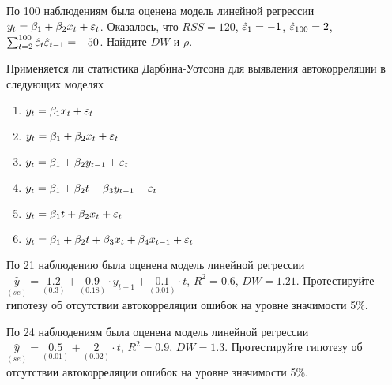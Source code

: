 \begin{problem}
По 100 наблюдениям была оценена модель линейной регрессии
$y_t=\beta_1+\beta_2 x_t+\varepsilon_t$. Оказалось, что $RSS=120$, $\hat{\varepsilon}_1=-1$, $\hat{\varepsilon}_{100}=2$, $\sum_{t=2}^{100} \hat{\varepsilon}_t\hat{\varepsilon}_{t-1}=-50$. Найдите $DW$ и $\rho$.


\begin{sol}
\end{sol}
\end{problem}



\begin{problem}
Применяется ли статистика Дарбина-Уотсона для выявления автокорреляции в следующих моделях
\begin{enumerate}
\item $y_t=\beta_1 x_t + \varepsilon_t$
\item $y_t=\beta_1 + \beta_2 x_t + \varepsilon_t$
\item $y_t=\beta_1 + \beta_2 y_{t-1} + \varepsilon_t$
\item $y_t=\beta_1 + \beta_2 t +\beta_3 y_{t-1} + \varepsilon_t$
\item $y_t=\beta_1 t + \beta_2 x_t + \varepsilon_t$
\item $y_t=\beta_1 + \beta_2 t +\beta_3 x_t +\beta_4 x_{t-1} + \varepsilon_t$
\end{enumerate}


\begin{sol}
\end{sol}
\end{problem}



\begin{problem}
По 21 наблюдению была оценена модель линейной регрессии
$\underset{(se)}{\hat{y}}=\underset{(0.3)}{1.2}+\underset{(0.18)}{0.9}\cdot y_{t-1}+\underset{(0.01)}{0.1}\cdot t$, $R^2=0.6$, $DW=1.21$. Протестируйте гипотезу об отсутствии автокорреляции ошибок на уровне значимости 5\%.


\begin{sol}
\end{sol}
\end{problem}




\begin{problem}
По 24 наблюдениям была оценена модель линейной регрессии
$\underset{(se)}{\hat{y}}=\underset{(0.01)}{0.5}+\underset{(0.02)}{2}\cdot t$, $R^2=0.9$, $DW=1.3$. Протестируйте гипотезу об отсутствии автокорреляции ошибок на уровне значимости 5\%.


\begin{sol}
\end{sol}
\end{problem}




